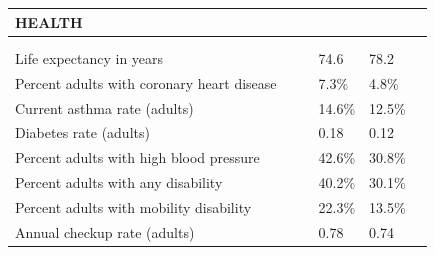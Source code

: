 \documentclass[9pt]{report}
\begin{document}
\newpage
\setlength{\tabcolsep}{.01in} %
\begin{tabular}{p{.10in}p{.10in}p{.10in}p{3.7in}>{\hfill}p{.85in}>{\hfill}p{.85in}>{\hfill}p{.85in}>{\hfill}p{.85in}p{0.1in}}
\multicolumn{9}{l}{\parbox{7.1in}{\raggedright{\large{\strut\textbf{HEALTH}\strut}}}} \\ 
\hline
\multicolumn{4}{l}{\parbox{3.5in}{\raggedright{\textbf{}}}} & \multicolumn{1}{r}{\parbox{.85in}{\strut\raggedleft{\textbf{}\strut}}} & \multicolumn{1}{r}{\parbox{.85in}{\strut\raggedleft{\textbf{}\strut}}} & \multicolumn{1}{r}{\parbox{.85in}{\strut{}}} & \multicolumn{1}{r}{\parbox{.85in}{\strut{}}} & \\ 
\multicolumn{9}{l}{} \\ 
\multicolumn{4}{l}{\parbox{3.6in}{\strut\raggedright{{Life expectancy in years}}\strut}} &  &  & 74.6 & 78.2 & \multicolumn{1}{l}{}  \\ 
\multicolumn{4}{l}{\parbox{3.6in}{\strut\raggedright{{Percent adults with coronary heart disease}}\strut}} &  &  & 7.3\% & 4.8\% & \multicolumn{1}{l}{}  \\ 
\multicolumn{4}{l}{\parbox{3.6in}{\strut\raggedright{{Current asthma rate (adults)}}\strut}} &  &  & 14.6\% & 12.5\% & \multicolumn{1}{l}{}  \\ 
\multicolumn{4}{l}{\parbox{3.6in}{\strut\raggedright{{Diabetes rate (adults)}}\strut}} &  &  & 0.18 & 0.12 & \multicolumn{1}{l}{}  \\ 
\multicolumn{4}{l}{\parbox{3.6in}{\strut\raggedright{{Percent adults with high blood pressure}}\strut}} &  &  & 42.6\% & 30.8\% & \multicolumn{1}{l}{}  \\ 
\multicolumn{4}{l}{\parbox{3.6in}{\strut\raggedright{{Percent adults with any disability}}\strut}} &  &  & 40.2\% & 30.1\% & \multicolumn{1}{l}{}  \\ 
\multicolumn{4}{l}{\parbox{3.6in}{\strut\raggedright{{Percent adults with mobility disability}}\strut}} &  &  & 22.3\% & 13.5\% & \multicolumn{1}{l}{}  \\ 
\multicolumn{4}{l}{\parbox{3.6in}{\strut\raggedright{{Annual checkup rate (adults)}}\strut}} &  &  & 0.78 & 0.74 & \multicolumn{1}{l}{}  \\ 

\end{tabular}
\end{document}
